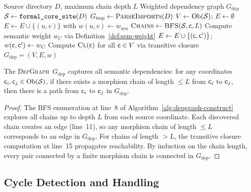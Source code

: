 \documentclass[11pt]{article}
\newcommand{\DepGraph}{\textsc{DepGraph}}
\newcommand{\FormalSite}{\texttt{formal\_core\_site}}
\begin{document}
\begin{algorithm}[H]
\caption{\DepGraph\ Construction}\label{alg:depgraph-construct}
\begin{algorithmic}[1]
\REQUIRE Source directory $D$, maximum chain depth $L$
\ENSURE Weighted dependency graph $G_{\mathrm{dep}}$
\STATE $\Site \leftarrow \FormalSite(D)$ 
\STATE $G_{\mathrm{imp}} \leftarrow \textsc{ParseImports}(D)$ 
\STATE $V \leftarrow \mathrm{Ob}(\mathcal{S})$; $E \leftarrow \emptyset$
  \STATE $E \leftarrow E \cup \{(u, v)\}$ with $w(u, v) \leftarrow w_{\mathrm{syn}}$
\ENDFOR
{}
  \STATE $\textsc{Chains} \leftarrow \textsc{BFS}(\mathcal{S}, \mathsf{c}, L)$
    \STATE Compute semantic weight $w_C$ via Definition~\ref{def:sem-weight}
      \STATE $E \leftarrow E \cup \{(\mathsf{c}, \mathsf{c}')\}$; $w(\mathsf{c}, \mathsf{c}') \leftarrow w_C$
    \ENDIF
  \ENDFOR
\ENDFOR
\STATE Compute $\textsc{Cl}(\mathsf{c})$ for all $\mathsf{c} \in V$ via transitive closure
\RETURN $G_{\mathrm{dep}} = (V, E, w)$
\end{algorithmic}
\end{algorithm}

\begin{theorem}\label{thm:graph-complete}
The \DepGraph\ $G_{\mathrm{dep}}$ captures all semantic dependencies:
for any coordinates $\mathsf{c}_i, \mathsf{c}_j \in \mathrm{Ob}(\mathcal{S})$, if there exists a
morphism chain of length $\leq L$ from $\mathsf{c}_i$ to $\mathsf{c}_j$, then there
is a path from $\mathsf{c}_i$ to $\mathsf{c}_j$ in $G_{\mathrm{dep}}$.
\end{theorem}

\begin{proof}
The BFS enumeration at line~8 of Algorithm~\ref{alg:depgraph-construct}
explores all chains up to depth $L$ from each source coordinate.  Each
discovered chain creates an edge (line~11), so any morphism chain of length
$\leq L$ corresponds to an edge in $G_{\mathrm{dep}}$.  For chains of
length $> L$, the transitive closure computation at line~15 propagates
reachability.  By induction on the chain length, every pair connected by a
finite morphism chain is connected in $G_{\mathrm{dep}}$.
\end{proof}

\subsection{Cycle Detection and Handling}\label{sec:cycle-detection}
\end{document}
